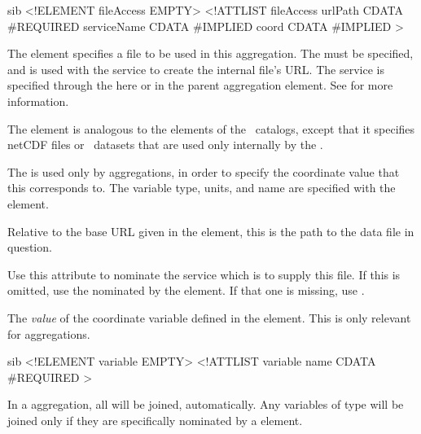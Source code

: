 
\begin{vcode}{sib}
<!ELEMENT fileAccess EMPTY>
<!ATTLIST fileAccess
    urlPath CDATA #REQUIRED
    serviceName CDATA #IMPLIED
    coord CDATA #IMPLIED
>
\end{vcode}

The  element specifies a file to be used in this
aggregation.  The  must be specified, and is used with
the service to create the internal file's URL.  The service is
specified through the  here or in the parent
aggregation element. See  for more
information.

The  element is analogous to the  elements
of the \thredds\ catalogs, except that it specifies netCDF files or
\opendap\ datasets that are used only internally by the \aggser .


The  is used only by  aggregations, in order
to specify the coordinate value that this  corresponds
to.  The variable type, units, and name are specified with the
 element.

\begin{description}


Relative to the base URL given in the  element, this is
the path to the data file in question.


Use this attribute to nominate the service which is to supply this
file.  If this is omitted, use the  nominated by the
 element.  If that one is missing, use .


The \emph{value} of the coordinate variable defined in the
 element.  This is only relevant for 
aggregations. 

\end{description}



\begin{vcode}{sib}
<!ELEMENT variable EMPTY>
<!ATTLIST variable
        name CDATA #REQUIRED
>
\end{vcode}

In a  aggregation, all  will be joined,
automatically.  Any variables of type  will be joined
only if they are specifically nominated by a  element.

